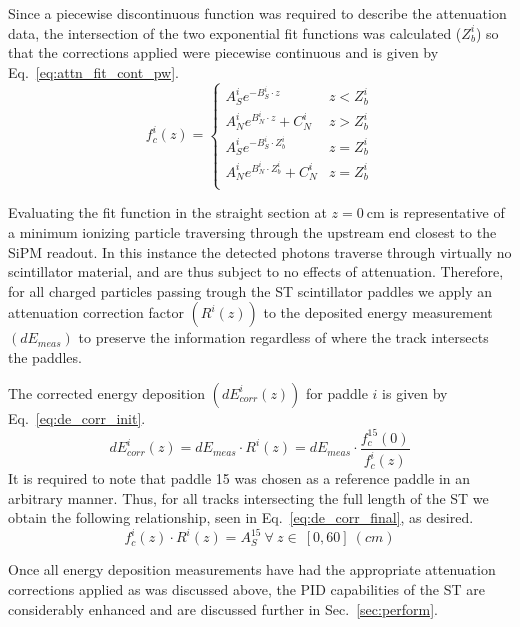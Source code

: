 Since a piecewise discontinuous function was required to describe the attenuation data, the intersection of the two exponential fit functions was calculated ($Z^{i}_{b}$) so that the corrections applied were piecewise continuous and is given by Eq.~\ref{eq:attn_fit_cont_pw}. 
	\begin{equation} \label{eq:attn_fit_cont_pw}
	f_{c}^{i}(z) = 
	\begin{cases} 
		A^{i}_{S}e^{-B^{i}_{S} \cdot z} & z < Z^{i}_{b} \\
		A^{i}_{N}e^{B^{i}_{N} \cdot z} + C^{i}_{N} & z > Z^{i}_{b} \\
		A^{i}_{S}e^{-B^{i}_{S} \cdot Z^{i}_{b}} & z = Z^{i}_{b} \\
		A^{i}_{N}e^{B^{i}_{N} \cdot Z^{i}_{b}} + C^{i}_{N} & z = Z^{i}_{b} \\
	\end{cases}
	\end{equation}

Evaluating the fit function in the straight section at $z = 0\ \mathrm{cm}$ is representative of a minimum ionizing particle traversing through the upstream end closest to the SiPM readout.  In this instance the detected photons traverse through virtually no scintillator material, and are thus subject to no effects of attenuation.  Therefore, for all charged particles passing trough the ST scintillator paddles we apply an attenuation correction factor $(R^{i}(z))$ to the deposited energy measurement $(dE_{meas})$ to preserve the information regardless of where the track intersects the paddles.

The corrected energy deposition $(dE^{i}_{corr}(z))$ for paddle $i$ is given by Eq.~\ref{eq:de_corr_init}. 
	\begin{equation} \label{eq:de_corr_init}
	dE^{i}_{corr} (z) = dE_{meas} \cdot R^{i}(z) = dE_{meas} \cdot \dfrac{f^{15}_{c}(0)}{f^{i}_{c}(z)}
	\end{equation}
It is required to note that paddle 15 was chosen as a reference paddle in an arbitrary manner.  Thus, for all tracks intersecting the full length of the ST we obtain the following relationship, seen in Eq.~\ref{eq:de_corr_final}, as desired.
	\begin{equation} \label{eq:de_corr_final}
	f^{i}_{c}(z) \cdot R^{i}(z) = A^{15}_{S}\ \forall\ z \in\ [0, 60]\ (cm)
	\end{equation}

Once all energy deposition measurements have had the appropriate attenuation corrections applied as was discussed above, the PID capabilities of the ST are considerably enhanced and are discussed further in Sec.~\ref{sec:perform}.